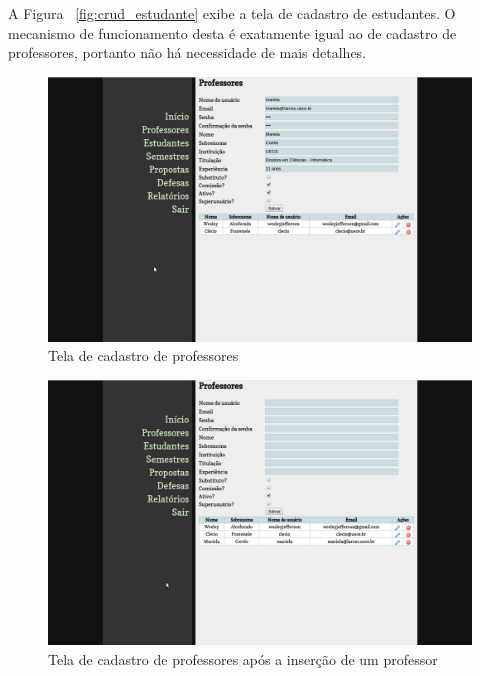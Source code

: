 A Figura ~\ref{fig:crud_estudante} exibe a tela de cadastro de estudantes. O mecanismo de funcionamento
desta é exatamente igual ao de cadastro de professores, portanto não há necessidade de mais detalhes.

\begin{figure}[h!tb]
\centering
\includegraphics[width=1\textwidth]{fig/telas/administrador/crud_professor_insercao.png}
\caption{Tela de cadastro de professores}
\label{fig:crud_professor_insercao}
\end{figure}

\begin{figure}[h!tb]
\centering
\includegraphics[width=1\textwidth]{fig/telas/administrador/crud_professor_listagem_pos_insercao.png}
\caption{Tela de cadastro de professores após a inserção de um professor}
\label{fig:crud_professor_listagem_pos_insercao}
\end{figure}

